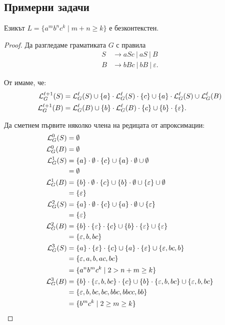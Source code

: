 \subsection{Примерни задачи}

\begin{example}
  Езикът $L = \{a^mb^nc^k\mid m+n \geq k\}$ е безконтекстен.
\end{example}  
\begin{proof}
  Да разгледаме граматиката $G$ с правила
  \begin{align*}
    S& \rightarrow aSc\ |\ aS\ |\ B\\
    B& \rightarrow bBc\ |\  bB\ |\ \varepsilon.
  \end{align*}

  От  имаме, че:
  \begin{align*}
    \mathcal{L}^{\ell+1}_G(S) & = \mathcal{L}^\ell_G(S) \cup \{a\} \cdot \mathcal{L}^\ell_G(S) \cdot \{c\} \cup \{a\}\cdot \mathcal{L}^\ell_G(S) \cup \mathcal{L}^\ell_G(B)\\
    \mathcal{L}^{\ell+1}_G(B) & = \mathcal{L}^\ell_G(B) \cup \{b\} \cdot \mathcal{L}^\ell_G(B) \cdot \{c\} \cup \{b\} \cdot \{\varepsilon\}.
  \end{align*}

  Да сметнем първите няколко члена на редицата от апроксимации:
  \begin{align*}
    \mathcal{L}^0_G(S) & = \emptyset\\
    \mathcal{L}^0_G(B) & = \emptyset\\
    \mathcal{L}^1_G(S) & = \{a\} \cdot \emptyset \cdot \{c\} \cup \{a\}\cdot\emptyset \cup \emptyset \\
              & = \emptyset\\
    \mathcal{L}^1_G(B) & = \{b\} \cdot \emptyset \cdot \{c\} \cup \{b\} \cdot \emptyset \cup \{\varepsilon\} \cup \emptyset \\
              & = \{\varepsilon\}\\
    \mathcal{L}^2_G(S) & = \{a\} \cdot \emptyset \cdot \{c\} \cup \{a\}\cdot\emptyset \cup \{\varepsilon\} \\
              & = \{\varepsilon\}\\
    \mathcal{L}^2_G(B) & = \{b\} \cdot \{\varepsilon\} \cdot \{c\} \cup \{b\}\cdot \{\varepsilon\} \cup \{\varepsilon\} \\
              & = \{\varepsilon,b,bc\}\\
    \mathcal{L}^3_G(S) & = \{a\} \cdot \{\varepsilon\} \cdot \{c\} \cup \{a\}\cdot\{\varepsilon\} \cup \{\varepsilon,bc,b\} \\
              & = \{\varepsilon, a, b, ac, bc\}\\
              & = \{a^nb^mc^k \mid 2 > n+m \geq k\}\\
    \mathcal{L}^3_G(B) & = \{b\} \cdot \{\varepsilon,b,bc\} \cdot \{c\} \cup \{b\}\cdot \{\varepsilon,b,bc\} \cup \{\varepsilon,b,bc\} \\
              & = \{\varepsilon,b,bc,bc,bbc,bbcc,bb\}\\
              & = \{ b^mc^k \mid 2 \geq m \geq k\}
  \end{align*}


\end{proof}
